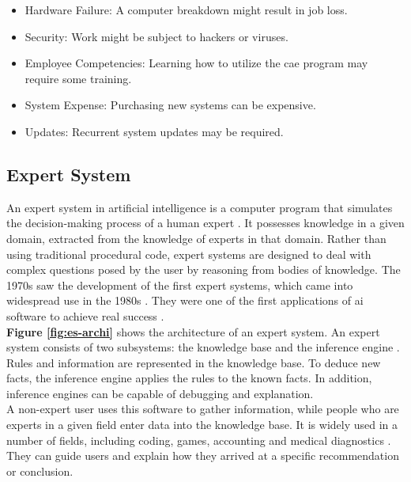     \begin{itemize}
        \item Hardware Failure: A computer breakdown might result in job loss.
        \item Security: Work might be subject to hackers or viruses.
        \item Employee Competencies: Learning how to utilize the \acrshort{cae} program may require some training.
        \item System Expense: Purchasing new systems can be expensive.
        \item Updates: Recurrent system updates may be required.
    \end{itemize}

\subsection{Expert System\label{subsec:exp-sys}}
An expert system in artificial intelligence is a computer program that simulates the decision-making process of a human expert \cite{liao2005expert, waterman1985guide}. It possesses knowledge in a given domain, extracted from the knowledge of experts in that domain.  Rather than using traditional procedural code, expert systems are designed to deal with complex questions posed by the user by reasoning from bodies of knowledge. The 1970s saw the development of the first expert systems, which came into widespread use in the 1980s \cite{buchanan1988fundamentals}. They were one of the first applications of \acrfull{ai} software to achieve real success \cite{buckley1986fuzzy, buchanan1988fundamentals, waterman1985guide}. \\

\textbf{Figure \ref{fig:es-archi}} shows the architecture of an expert system. An expert system consists of two subsystems: the knowledge base and the inference engine \cite{tripathi2011review}. Rules and information are represented in the knowledge base. To deduce new facts, the inference engine applies the rules to the known facts. In addition, inference engines can be capable of debugging and explanation.\\

A non-expert user uses this software to gather information, while people who are experts in a given field enter data into the knowledge base. It is widely used in a number of fields, including coding, games, accounting and medical diagnostics \cite{liao2005expert}. They can guide users and explain how they arrived at a specific recommendation or conclusion.\\

